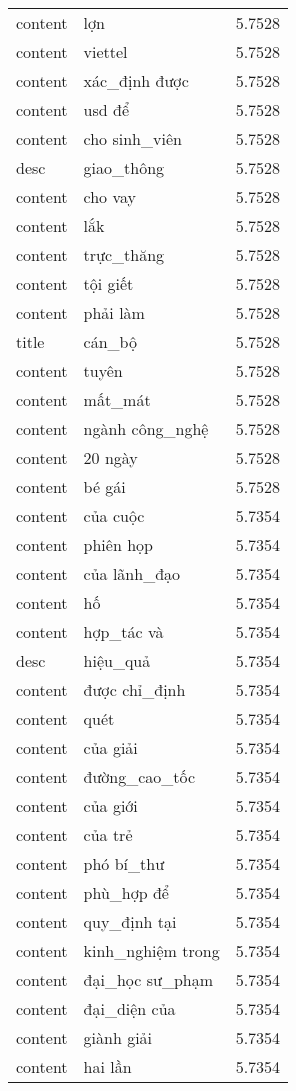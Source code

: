 \documentclass{article}
\begin{document}
\begin{tabular}{lll}
content & lợn & 5.7528\\
content & viettel & 5.7528\\
content & xác\_định được & 5.7528\\
content & usd để & 5.7528\\
content & cho sinh\_viên & 5.7528\\
desc & giao\_thông & 5.7528\\
content & cho vay & 5.7528\\
content & lắk & 5.7528\\
content & trực\_thăng & 5.7528\\
content & tội giết & 5.7528\\
content & phải làm & 5.7528\\
title & cán\_bộ & 5.7528\\
content & tuyên & 5.7528\\
content & mất\_mát & 5.7528\\
content & ngành công\_nghệ & 5.7528\\
content & 20 ngày & 5.7528\\
content & bé gái & 5.7528\\
content & của cuộc & 5.7354\\
content & phiên họp & 5.7354\\
content & của lãnh\_đạo & 5.7354\\
content & hố & 5.7354\\
content & hợp\_tác và & 5.7354\\
desc & hiệu\_quả & 5.7354\\
content & được chỉ\_định & 5.7354\\
content & quét & 5.7354\\
content & của giải & 5.7354\\
content & đường\_cao\_tốc & 5.7354\\
content & của giới & 5.7354\\
content & của trẻ & 5.7354\\
content & phó bí\_thư & 5.7354\\
content & phù\_hợp để & 5.7354\\
content & quy\_định tại & 5.7354\\
content & kinh\_nghiệm trong & 5.7354\\
content & đại\_học sư\_phạm & 5.7354\\
content & đại\_diện của & 5.7354\\
content & giành giải & 5.7354\\
content & hai lần & 5.7354\\

\end{tabular}
\end{document}
